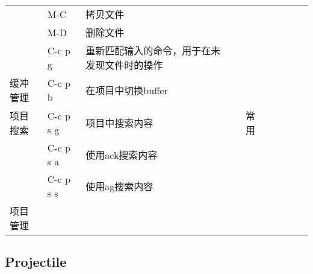 \documentclass[10pt,a4paper]{article}
\begin{document}
\begin{table}[htb]
\begin{tabular}{l{2cm}|lp{2cm}r|lp{2cm}r|l{2cm}|l}
 & M-C & 拷贝文件 &  & \\
 & M-D & 删除文件 &  & \\
 & C-c p g & 重新匹配输入的命令，用于在未发现文件时的操作 &  & \\
\hline
缓冲管理 & C-c p b & 在项目中切换buffer &  & \\
\hline
项目搜索 & C-c p s g & 项目中搜索内容 & 常用 & \\
 & C-c p s a & 使用ack搜索内容 &  & \\
 & C-c p s s & 使用ag搜索内容 &  & \\
\hline
项目管理 &  &  &  & \\
\end{tabular}
\end{table}

\subsection{Projectile}
\label{sec-3-8}
\end{document}
